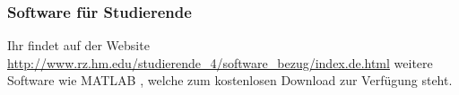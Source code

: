 \subsubsection{Software für Studierende} 
Ihr  findet auf der Website \url{http://www.rz.hm.edu/studierende_4/software_bezug/index.de.html} weitere Software wie MATLAB , welche zum kostenlosen
Download zur Verfügung steht.